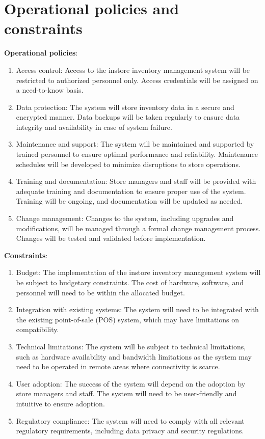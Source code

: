 \section{Operational policies and constraints \label{Section::Operationalpoliciesandconstraints}}
\textbf{Operational policies}:
\begin{enumerate}
    \item Access control: Access to the instore inventory management system will be restricted to authorized personnel only. Access credentials will be assigned on a need-to-know basis.

    \item Data protection: The system will store inventory data in a secure and encrypted manner. Data backups will be taken regularly to ensure data integrity and availability in case of system failure.

    \item Maintenance and support: The system will be maintained and supported by trained personnel to ensure optimal performance and reliability. Maintenance schedules will be developed to minimize disruptions to store operations.

    \item Training and documentation: Store managers and staff will be provided with adequate training and documentation to ensure proper use of the system. Training will be ongoing, and documentation will be updated as needed.

    \item Change management: Changes to the system, including upgrades and modifications, will be managed through a formal change management process. Changes will be tested and validated before implementation.
\end{enumerate}
\textbf{Constraints}:
\begin{enumerate}
    \item Budget: The implementation of the instore inventory management system will be subject to budgetary constraints. The cost of hardware, software, and personnel will need to be within the allocated budget.

    \item Integration with existing systems: The system will need to be integrated with the existing point-of-sale (POS) system, which may have limitations on compatibility.

    \item Technical limitations: The system will be subject to technical limitations, such as hardware availability and bandwidth limitations as the system may need to be operated in remote areas where connectivity is scarce.

    \item User adoption: The success of the system will depend on the adoption by store managers and staff. The system will need to be user-friendly and intuitive to ensure adoption.

    \item Regulatory compliance: The system will need to comply with all relevant regulatory requirements, including data privacy and security regulations.
\end{enumerate}
